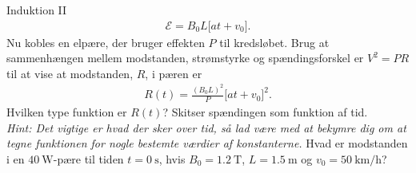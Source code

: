 \begin{opgave}{Induktion II}
    \begin{align}
        \mathcal{E} = B_0L\Big[at + v_0\Big].
    \end{align}
    \opg Nu kobles en elpære, der bruger effekten $P$ til kredsløbet. Brug at sammenhængen mellem modstanden, strømstyrke og spændingsforskel er $V^2=PR$ til at vise at modstanden, $R$, i pæren er
    \begin{align} \label{eq:induktion_ii_modstand}
        R(t) = \frac{(B_0L)^2}{P}\Big[at + v_0\Big]^2.
    \end{align}
    \opg Hvilken type funktion er $R(t)$?
    \opg Skitser spændingen som funktion af tid. \\
    \textit{Hint: Det vigtige er hvad der sker over tid, så lad være med at bekymre dig om at tegne funktionen for nogle bestemte værdier af konstanterne.}
    \opg Hvad er modstanden i en $\SI{40}{\watt}$-pære til tiden $t = \SI{0}{\second}$, hvis $B_0 = \SI{1,2}{\tesla}$, $L = \SI{1,5}{\metre}$ og $v_0 = \SI{50}{\kilo\metre\per\hour}$?
\end{opgave}